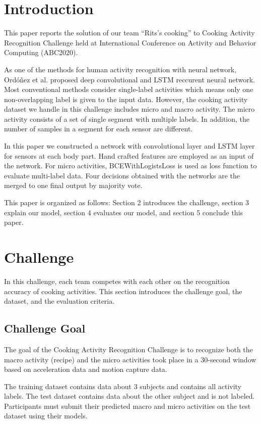 \documentclass{svmult}
\begin{document}
\section{Introduction}
\label{sec:intro}
This paper reports the solution of our team ``Rits's cooking'' to Cooking Activity Recognition Challenge held at International Conference on Activity and Behavior Computing (ABC2020).

As one of the methods for human activity recognition with neural network, Ordóñez et al. proposed deep convolutional and LSTM reccurent neural network\cite{deepconv}. Most conventional methods consider single-label activities which means only one non-overlapping label is given to the input data. However, the cooking activity dataset we handle in this challenge includes micro and macro activity. The micro activity consists of a set of single segment with multiple labels. In addition, the number of samples in a segment for each sensor are different.

In this paper we constructed a network with convolutional layer and LSTM layer for sensors at each body part. Hand crafted features are employed as an input of the network. For micro activities, BCEWithLogistsLoss is used as loss function to evaluate multi-label data. Four decisions obtained with the networks are the merged to one final output by majority vote.

This paper is organized as follows: Section 2 introduces the challenge, section 3 explain our model, section 4 evaluates our model, and section 5 conclude this paper.

\section{Challenge}
\label{sec:challenge}
In this challenge, each team competes with each other on the recognition accuracy of cooking activities. This section introduces the challenge goal, the dataset, and the evaluation criteria.

\subsection{Challenge Goal}
The goal of the Cooking Activity Recognition Challenge is to recognize both the macro activity (recipe) and the micro activities took place in a 30-second window based on acceleration data and motion capture data.

The training dataset contains data about 3 subjects and contains all activity labels. The test dataset contains data about the other subject and is not labeled. Participants must submit their predicted macro and micro activities on the test dataset using their models.
\end{document}

